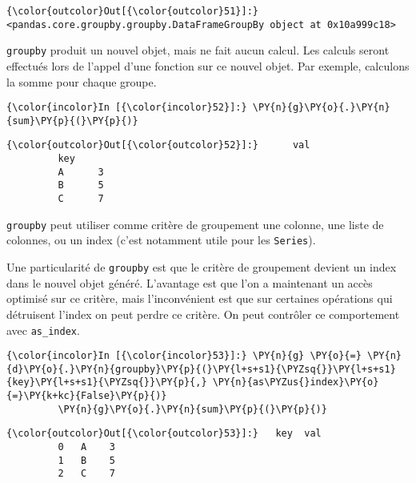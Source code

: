 \begin{Verbatim}[commandchars=\\\{\}]
{\color{outcolor}Out[{\color{outcolor}51}]:} <pandas.core.groupby.groupby.DataFrameGroupBy object at 0x10a999c18>
\end{Verbatim}
            
    \texttt{groupby} produit un nouvel objet, mais ne fait aucun calcul. Les
calculs seront effectués lors de l'appel d'une fonction sur ce nouvel
objet. Par exemple, calculons la somme pour chaque groupe.

    \begin{Verbatim}[commandchars=\\\{\}]
{\color{incolor}In [{\color{incolor}52}]:} \PY{n}{g}\PY{o}{.}\PY{n}{sum}\PY{p}{(}\PY{p}{)}
\end{Verbatim}


\begin{Verbatim}[commandchars=\\\{\}]
{\color{outcolor}Out[{\color{outcolor}52}]:}      val
         key     
         A      3
         B      5
         C      7
\end{Verbatim}
            
    \texttt{groupby} peut utiliser comme critère de groupement une colonne,
une liste de colonnes, ou un index (c'est notamment utile pour les
\texttt{Series}).

Une particularité de \texttt{groupby} est que le critère de groupement
devient un index dans le nouvel objet généré. L'avantage est que l'on a
maintenant un accès optimisé sur ce critère, mais l'inconvénient est que
sur certaines opérations qui détruisent l'index on peut perdre ce
critère. On peut contrôler ce comportement avec \texttt{as\_index}.

    \begin{Verbatim}[commandchars=\\\{\}]
{\color{incolor}In [{\color{incolor}53}]:} \PY{n}{g} \PY{o}{=} \PY{n}{d}\PY{o}{.}\PY{n}{groupby}\PY{p}{(}\PY{l+s+s1}{\PYZsq{}}\PY{l+s+s1}{key}\PY{l+s+s1}{\PYZsq{}}\PY{p}{,} \PY{n}{as\PYZus{}index}\PY{o}{=}\PY{k+kc}{False}\PY{p}{)}
         \PY{n}{g}\PY{o}{.}\PY{n}{sum}\PY{p}{(}\PY{p}{)}
\end{Verbatim}


\begin{Verbatim}[commandchars=\\\{\}]
{\color{outcolor}Out[{\color{outcolor}53}]:}   key  val
         0   A    3
         1   B    5
         2   C    7
\end{Verbatim}
            
